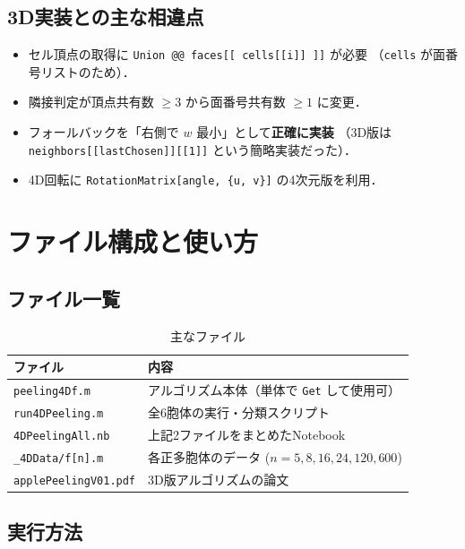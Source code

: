 \documentclass[12pt,a4paper]{article}
\theoremstyle{definition}
\begin{document}
\subsection{3D実装との主な相違点}

\begin{itemize}
  \item セル頂点の取得に \texttt{Union @@ faces[[ cells[[i]] ]]} が必要
        （\texttt{cells} が面番号リストのため）．
  \item 隣接判定が頂点共有数 $\geq 3$ から面番号共有数 $\geq 1$ に変更．
  \item フォールバックを「右側で $w$ 最小」として\textbf{正確に実装}
        （3D版は \texttt{neighbors[[lastChosen]][[1]]} という簡略実装だった）．
  \item 4D回転に \texttt{RotationMatrix[angle, \{u, v\}]} の4次元版を利用．
\end{itemize}


\section{ファイル構成と使い方}

\subsection{ファイル一覧}

\begin{table}[h]
\centering
\caption{主なファイル}
\begin{tabular}{ll}
\toprule
ファイル & 内容 \\
\midrule
\texttt{peeling4Df.m}       & アルゴリズム本体（単体で \texttt{Get} して使用可） \\
\texttt{run4DPeeling.m}     & 全6胞体の実行・分類スクリプト \\
\texttt{4DPeelingAll.nb}    & 上記2ファイルをまとめたNotebook \\
\texttt{\_4DData/f[n].m}    & 各正多胞体のデータ ($n=5,8,16,24,120,600$) \\
\texttt{applePeelingV01.pdf}& 3D版アルゴリズムの論文 \\
\bottomrule
\end{tabular}
\end{table}

\subsection{実行方法}
\end{document}
